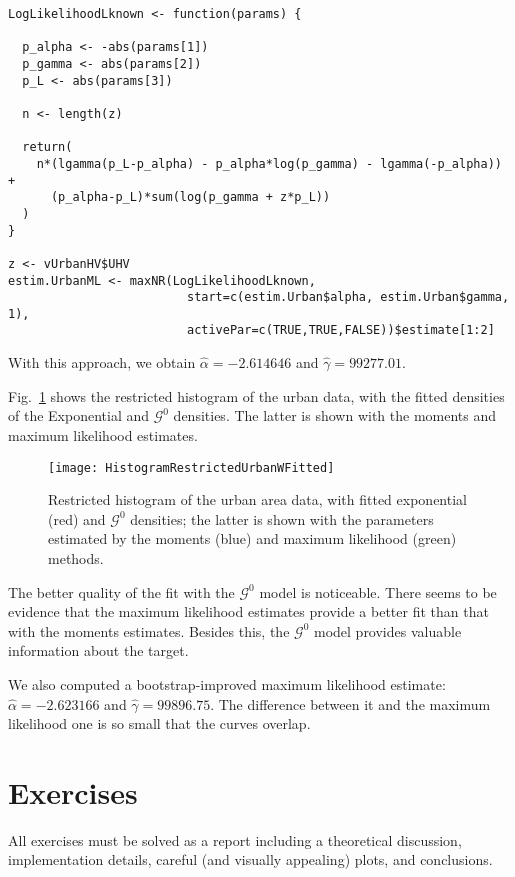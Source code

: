 \begin{lstlisting}[frame=lines]
LogLikelihoodLknown <- function(params) {
  
  p_alpha <- -abs(params[1])
  p_gamma <- abs(params[2])
  p_L <- abs(params[3])
  
  n <- length(z)
  
  return(
    n*(lgamma(p_L-p_alpha) - p_alpha*log(p_gamma) - lgamma(-p_alpha)) + 
      (p_alpha-p_L)*sum(log(p_gamma + z*p_L)) 
  )
}

z <- vUrbanHV$UHV
estim.UrbanML <- maxNR(LogLikelihoodLknown, 
                         start=c(estim.Urban$alpha, estim.Urban$gamma, 1), 
                         activePar=c(TRUE,TRUE,FALSE))$estimate[1:2]
\end{lstlisting}

With this approach, we obtain $\widehat{\alpha}=-2.614646$ and $\widehat\gamma=99277.01$.

Fig.~\ref{Fig:UrbanFitted} shows the restricted histogram of the urban data, with the fitted densities of the Exponential and $\mathcal G^0$ densities.
The latter is shown with the moments and maximum likelihood estimates.

\begin{figure}[hbt]
\centering
\texttt{[image: HistogramRestrictedUrbanWFitted]}
\caption{Restricted histogram of the urban area data, with fitted exponential (red) and $\mathcal G^0$ densities; the latter is shown with the parameters estimated by the moments (blue) and maximum likelihood (green) methods.}\label{Fig:UrbanFitted}
\end{figure}

The better quality of the fit with the $\mathcal G^0$ model is noticeable.
There seems to be evidence that the maximum likelihood estimates provide a better fit than that with the moments estimates.
Besides this, the $\mathcal G^0$ model provides valuable information about the target.

We also computed a bootstrap-improved maximum likelihood estimate:
$\widehat\alpha=-2.623166$ and $\widehat\gamma=99896.75$.
The difference between it and the maximum likelihood one is so small that the curves overlap.

\section*{Exercises}

All exercises must be solved as a report including a theoretical discussion, implementation details, careful (and visually appealing) plots, and conclusions.

